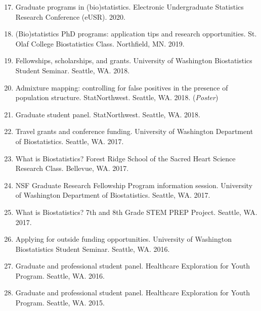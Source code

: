 \documentclass[margin]{res}
\newenvironment{benumerate}[1]{
    \let\oldItem\item
    \def\item{\addtocounter{enumi}{-2}\oldItem}
    
    \begin{enumerate}
    \setcounter{enumi}{#1}
    \addtocounter{enumi}{1}
}{
    \end{enumerate}
}
\begin{document}
\begin{resume}
\begin{benumerate}{16}
\item Graduate programs in (bio)statistics. Electronic Undergraduate Statistics Research Conference (eUSR). 2020.

\item (Bio)statistics PhD programs: application tips and research opportunities. St. Olaf College Biostatistics Class. Northfield, MN. 2019.

\item Fellowships, scholarships, and grants. University of Washington Biostatistics Student Seminar. Seattle, WA. 2018.

\item %
Admixture mapping: controlling for false positives in the presence of population structure. StatNorthwest. Seattle, WA. 2018. (\textit{Poster})

\item Graduate student panel. StatNorthwest. Seattle, WA. 2018.

\item %
Travel grants and conference funding. University of Washington Department of Biostatistics. Seattle, WA. 2017.

\item %
What is Biostatistics? Forest Ridge School of the Sacred Heart Science Research Class. Bellevue, WA. 2017.

\item %
NSF Graduate Research Fellowship Program information session. University of Washington Department of Biostatistics. Seattle, WA. 2017.

\item %
What is Biostatistics? 7th and 8th Grade STEM PREP Project. Seattle, WA. 2017. %

\item %
Applying for outside funding opportunities. University of Washington Biostatistics Student Seminar. Seattle, WA. 2016.

\item Graduate and professional student panel. Healthcare Exploration for Youth Program. Seattle, WA. 2016.

\item Graduate and professional student panel. Healthcare Exploration for Youth Program. Seattle, WA. 2015.


\end{benumerate}
\end{resume}
\end{document}
